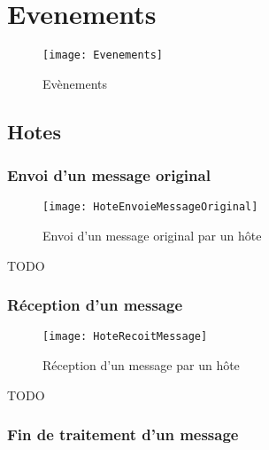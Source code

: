\documentclass[a4paper,11pt]{article}
\begin{document}

\tableofcontents %
\pagebreak
\listoffigures %
\pagebreak











\section{Evenements}

\begin{figure}[h!t]
  \centering
    \texttt{[image: Evenements]}
  \caption{Evènements}
  \label{fig:evenements}
\end{figure}

\subsection{Hotes}
\subsubsection{Envoi d'un message original}

\begin{figure}[h!t]
  \centering
    \texttt{[image: HoteEnvoieMessageOriginal]}
  \caption{Envoi d'un message original par un hôte}
  \label{fig:hote-envoie-message-original}
\end{figure}

TODO


\subsubsection{Réception d'un message}

\begin{figure}[h!t]
  \centering
    \texttt{[image: HoteRecoitMessage]}
  \caption{Réception d'un message par un hôte}
  \label{fig:hote-recoit-message}
\end{figure}

TODO

\subsubsection{Fin de traitement d'un message}
\end{document}
